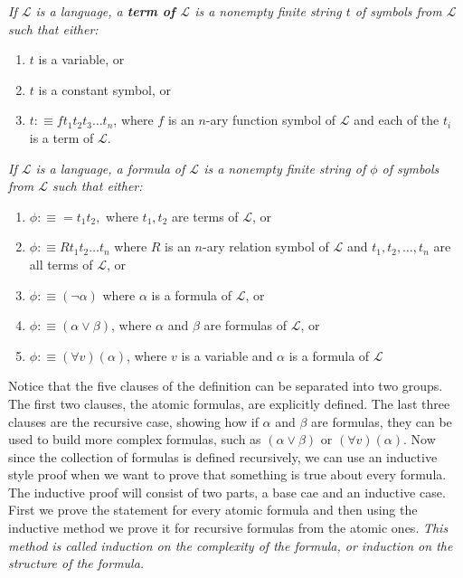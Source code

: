 \documentclass[10pt,a4paper]{article}
\newcommand{\curveL}{\mathcal{L}}
\begin{document}
                    \begin{define}
                        \textit{If $\curveL$ is a language, a \textbf{term of $\curveL$} is a nonempty finite string $t$ of symbols from $\curveL$ such that either:}
                        \begin{enumerate}
                            \item $t$ is a variable, or
                            \item $t$ is a constant symbol, or 
                            \item $t:\equiv ft_1t_2t_3\dots t_n$, where $f$ is an $n$-ary function symbol of $\curveL$ and each of the $t_i$ is a term of $\curveL$.
                        \end{enumerate}
                    \end{define}
                    \begin{define}
                        \textit{If $\curveL$ is a language, a formula of $\curveL$ is a nonempty finite string of $\phi$ of symbols from $\curveL$ such that either:}
                        \begin{enumerate}
                            \item $\phi :\equiv = t_1t_2,$ where $t_1, t_2$ are terms of $\curveL$, or 
                            \item $\phi :\equiv R t_1t_2\dots t_n$ where $R$ is an $n$-ary relation symbol of $\curveL$ and $t_1, t_2, \dots , t_n$ are all terms of $\curveL$, or 
                            \item $\phi :\equiv (\neg \alpha)$ where $\alpha$ is a formula of $\curveL$, or
                            \item $\phi:\equiv (\alpha\lor \beta)$, where $\alpha$ and $\beta$ are formulas of $\curveL$, or 
                            \item $\phi :\equiv (\forall v)(\alpha)$, where $v$ is a variable and $\alpha$ is a formula of $\curveL$
                        \end{enumerate}
                    \end{define}
                    Notice that the five clauses of the definition can be separated into two groups. The first two clauses, the atomic formulas, are explicitly defined. The last three clauses are the recursive case, showing how if $\alpha$ and $\beta$ are formulas, they can be used to build more complex formulas, such as $(\alpha\lor\beta)$ or $(\forall v)(\alpha)$.
                    Now since the collection of formulas is defined recursively, we can use an inductive style proof when we want to prove that something is true about every formula. The inductive proof will consist of two parts, a base cae and an inductive case. First we prove the statement for every atomic formula and then using the inductive method we prove it for recursive formulas from the atomic ones. \textit{This method is called induction on the complexity of the formula, or induction on the structure of the formula.}
\end{document}
